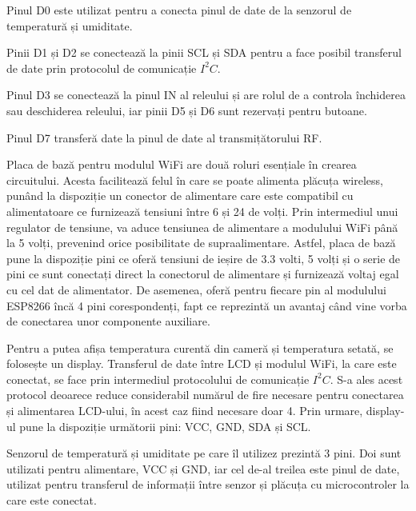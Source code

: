 	Pinul D0 este utilizat pentru a conecta pinul de date de la senzorul de temperatură și umiditate.

	Pinii D1 și D2 se conectează la pinii SCL și SDA pentru a face posibil transferul de date prin protocolul de comunicație $I^2C$.

	Pinul D3 se conectează la pinul IN al releului și are rolul de a controla închiderea sau deschiderea releului, iar pinii D5 și D6 sunt rezervați pentru butoane. 

	Pinul D7 transferă date la pinul de date al transmițătorului RF. 

\vspace{1em}

	Placa de bază pentru modulul WiFi are două roluri esențiale în crearea circuitului. Acesta facilitează felul în care se poate alimenta plăcuța wireless, punând la dispoziție un conector de alimentare care este compatibil cu alimentatoare ce furnizează tensiuni între 6 și 24 de volți. Prin intermediul unui regulator de tensiune, va aduce tensiunea de alimentare a modulului WiFi până la 5 volți, prevenind orice posibilitate de supraalimentare. Astfel, placa de bază pune la dispoziție pini ce oferă tensiuni de ieșire de 3.3 volti, 5 volți și o serie de pini ce sunt conectați direct la conectorul de alimentare și furnizează voltaj egal cu cel dat de alimentator. De asemenea, oferă pentru fiecare pin al modulului ESP8266 încă 4 pini corespondenți, fapt ce reprezintă un avantaj când vine vorba de conectarea unor componente auxiliare.

\vspace{1em}

	Pentru a putea afișa temperatura curentă din cameră și temperatura setată, se folosește un display. Transferul de date între LCD și modulul WiFi, la care este conectat, se face prin intermediul protocolului de comunicație $I^2C$. S-a ales acest protocol deoarece reduce considerabil numărul de fire necesare pentru conectarea și alimentarea LCD-ului, în acest caz fiind necesare doar 4. Prin urmare, display-ul pune la dispoziție următorii pini:  VCC, GND, SDA și SCL.

\vspace{1em}

	Senzorul de temperatură și umiditate pe care îl utilizez prezintă 3 pini. Doi sunt utilizati pentru alimentare, VCC și GND, iar cel de-al treilea este pinul de date, utilizat pentru transferul de informații între senzor și plăcuța cu microcontroler la care este conectat.

